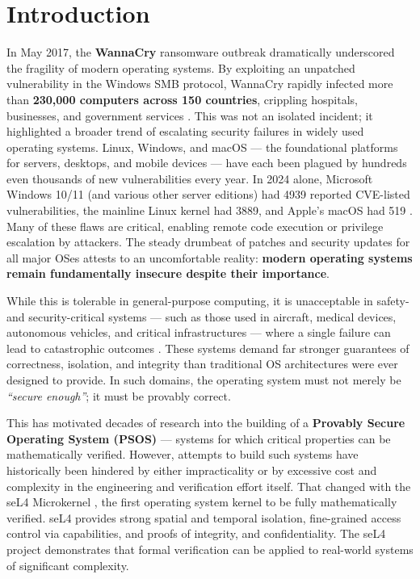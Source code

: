 \chapter{Introduction}\label{ch:intro}
In May 2017, the \textbf{WannaCry} ransomware outbreak dramatically underscored the fragility of modern operating systems. By exploiting an unpatched vulnerability in the Windows SMB protocol, WannaCry rapidly infected more than \textbf{230,000 computers across 150 countries}, crippling hospitals, businesses, and government services \citep{nist2017wannacry}. This was not an isolated incident; it highlighted a broader trend of escalating security failures in widely used operating systems. Linux, Windows, and macOS --- the foundational platforms for servers, desktops, and mobile devices --- have each been plagued by hundreds even thousands of new vulnerabilities every year. In 2024 alone, Microsoft Windows 10/11 (and various other server editions) had 4939 reported CVE-listed vulnerabilities, the mainline Linux kernel had 3889, and Apple’s macOS had 519 \citep{stackwatch2024stats}. Many of these flaws are critical, enabling remote code execution or privilege escalation by attackers. The steady drumbeat of patches and security updates for all major OSes attests to an uncomfortable reality: \textbf{modern operating systems remain fundamentally insecure despite their importance}.

While this is tolerable in general-purpose computing, it is unacceptable in safety- and security-critical systems --- such as those used in aircraft, medical devices, autonomous vehicles, and critical infrastructures --- where a single failure can lead to catastrophic outcomes \citep{butler1993-infeasibility, rushby1997-formal-methods}. These systems demand far stronger guarantees of correctness, isolation, and integrity than traditional OS architectures were ever designed to provide. In such domains, the operating system must not merely be \emph{``secure enough''}; it must be provably correct.

This has motivated decades of research into the building of a \textbf{Provably Secure Operating System (PSOS)} \citep{neumann1975psos, feiertag1979psos, neumann1980psos, neumann2003psos} --- systems for which critical properties can be mathematically verified. However, attempts to build such systems have historically been hindered by either impracticality or by excessive cost and complexity in the engineering and verification effort itself. That changed with the seL4 Microkernel \citep{klein2009seL4}, the first operating system kernel to be fully mathematically verified. seL4 provides strong spatial and temporal isolation, fine-grained access control via capabilities, and proofs of integrity, and confidentiality. The seL4 project demonstrates that formal verification can be applied to real-world systems of significant complexity.

